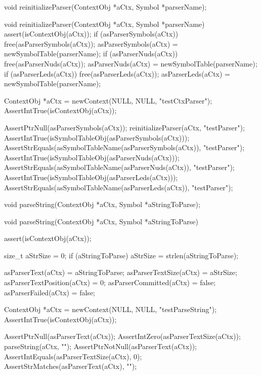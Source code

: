 \startTestSuite[reinitializeParser]

\startCHeader
void reinitializeParser(ContextObj *aCtx, Symbol *parserName);
\stopCHeader

\startCCode
void reinitializeParser(ContextObj *aCtx, Symbol *parserName) {
  assert(isContextObj(aCtx));
  if (asParserSymbols(aCtx)) free(asParserSymbols(aCtx));
  asParserSymbols(aCtx)    = newSymbolTable(parserName);
  if (asParserNuds(aCtx))    free(asParserNuds(aCtx));
  asParserNuds(aCtx)       = newSymbolTable(parserName);
  if (asParserLeds(aCtx))    free(asParserLeds(aCtx));
  asParserLeds(aCtx)       = newSymbolTable(parserName);
}
\stopCCode


\startCTest
  ContextObj *aCtx = newContext(NULL, NULL, "testCtxParser");
  AssertIntTrue(isContextObj(aCtx));
  
  AssertPtrNull(asParserSymbols(aCtx));
  reinitializeParser(aCtx, "testParser");
  AssertIntTrue(isSymbolTableObj(asParserSymbols(aCtx)));
  AssertStrEquals(asSymbolTableName(asParserSymbols(aCtx)), "testParser");
  AssertIntTrue(isSymbolTableObj(asParserNuds(aCtx)));
  AssertStrEquals(asSymbolTableName(asParserNuds(aCtx)),    "testParser");
  AssertIntTrue(isSymbolTableObj(asParserLeds(aCtx)));
  AssertStrEquals(asSymbolTableName(asParserLeds(aCtx)),    "testParser");
\stopCTest
\stopTestCase
\stopTestSuite


\startTestSuite[parseString]

\startCHeader
void parseString(ContextObj *aCtx, Symbol *aStringToParse);
\stopCHeader

\startCCode
void parseString(ContextObj *aCtx, Symbol *aStringToParse) {
  assert(isContextObj(aCtx));
  
  size_t aStrSize = 0;
  if (aStringToParse) aStrSize = strlen(aStringToParse);
    
  asParserText(aCtx)         = aStringToParse;
  asParserTextSize(aCtx)     = aStrSize;
  asParserTextPosition(aCtx) = 0;
  asParserCommitted(aCtx)    = false;
  asParserFailed(aCtx)       = false;
}
\stopCCode


\startCTest
  ContextObj *aCtx = newContext(NULL, NULL, "testParseString");
  AssertIntTrue(isContextObj(aCtx));
  
  AssertPtrNull(asParserText(aCtx));
  AssertIntZero(asParserTextSize(aCtx));
  parseString(aCtx, "");
  AssertPtrNotNull(asParserText(aCtx));
  AssertIntEquals(asParserTextSize(aCtx), 0);
  AssertStrMatches(asParserText(aCtx), "");
  
